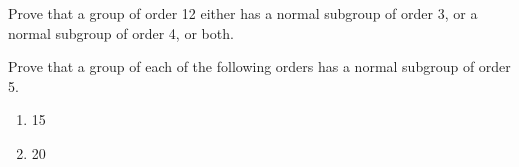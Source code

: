 \begin{exercise}\label{exercise-group-of-order-12-has-normal-subgroup-of-3-or-4}
    Prove that a group of order 12 either has a normal subgroup of order 3, or a normal subgroup of order 4, or both.
\end{exercise}

\begin{exercise}\label{exercise-group-of-order-15-or-20-has-normal-subgroup-of-order-5}
    Prove that a group of each of the following orders has a normal subgroup of order 5.
    \begin{enumerate}[label=(\alph*)]
        \item 15
        \item 20
    \end{enumerate}
\end{exercise}

    
    

